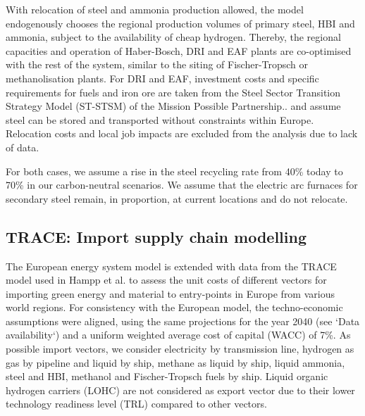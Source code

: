 With relocation of steel and ammonia production allowed, the model endogenously chooses the regional
production volumes of primary steel, HBI and ammonia, subject to the
availability of cheap hydrogen. Thereby, the regional capacities and operation
of Haber-Bosch, DRI and EAF plants are co-optimised with the rest of the system,
similar to the siting of Fischer-Tropsch or methanolisation plants. For DRI and
EAF, investment costs and specific requirements for fuels and iron ore are taken
from the Steel Sector Transition Strategy Model (ST-STSM) of the Mission
Possible
Partnership.\cite{missionpossiblepartnershipSteelSectorTransition2022,missionpossiblepartnershipMakingNetZeroSteel2022}.
and assume steel can be stored and transported without constraints within
Europe. Relocation costs and local job impacts are excluded from the analysis
due to lack of data.

For both cases, we assume a rise in the steel recycling rate from 40\% today to
70\% in our carbon-neutral
scenarios.\cite{materialeconomicsIndustrialTransformation20502019} We assume that
the electric arc furnaces for secondary steel remain, in proportion, at current
locations and do not relocate.

\subsection*{TRACE: Import supply chain modelling}

The European energy system model is extended with data from the TRACE model used
in Hampp et al.\cite{hamppImportOptions2023} to assess the unit costs of
different vectors for importing green energy and material to entry-points in
Europe from various world regions. For consistency with the European model, the
techno-economic assumptions were aligned, using the same projections for the
year 2040 (see `Data availability`) and a uniform weighted average cost of
capital (WACC) of 7\%.\cite{lonerganImprovingRepresentationCost2023} As possible
import vectors, we consider electricity by transmission line, hydrogen as gas by
pipeline and liquid by ship, methane as liquid by ship, liquid ammonia, steel
and HBI, methanol and Fischer-Tropsch fuels by ship. Liquid organic hydrogen
carriers (LOHC) are not considered as export vector due to their lower
technology readiness level (TRL) compared to other
vectors.\cite{irenaGlobalHydrogenTrade2022}

